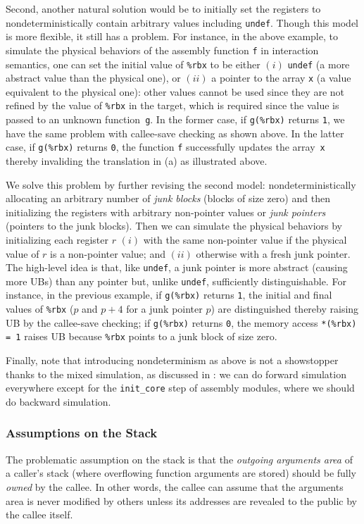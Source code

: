 Second, another natural solution would be to initially set the
\nip{} registers to nondeterministically contain arbitrary
values including \texttt{undef}. Though this model is more flexible,
it still has a problem. For instance, in the above example, to
simulate the physical behaviors of the assembly function \texttt{f} in
interaction semantics, one can set the initial value of \texttt{\%rbx} to
be either $(i)$ \texttt{undef} (\ie a more abstract value than the physical one), or
$(ii)$ a pointer to the array \texttt{x} (\ie a value equivalent to the physical one):
other values cannot be used since they are not refined by the value of \texttt{\%rbx} in the target,
which is required since the value is passed to an unknown function~\texttt{g}.
In the former case, if
\texttt{g(\%rbx)} returns \texttt{1}, we have the same problem with
callee-save checking as shown above.  In the latter case, if
\texttt{g(\%rbx)} returns \texttt{0}, the function \texttt{f}
successfully updates the array~\texttt{x} thereby invaliding the
translation in (a) as illustrated above.

We solve this problem by further revising the second model:
nondeterministically allocating an arbitrary number of \emph{junk
  blocks} (\ie blocks of size zero) and then initializing the
\nip{} registers with arbitrary non-pointer values or
\emph{junk pointers} (\ie pointers to the junk blocks).  Then we can
simulate the physical behaviors by initializing each register $r$
$(i)$ with the same non-pointer value if the physical value of $r$ is
a non-pointer value; and $(ii)$ otherwise with a fresh junk pointer.
The high-level idea is that, like \texttt{undef}, a junk pointer is
more abstract (\ie causing more UBs) than any pointer but, unlike
\texttt{undef}, sufficiently distinguishable. For instance,
in the previous example, if \texttt{g(\%rbx)} returns \texttt{1},
the initial and final values of \texttt{\%rbx} (\ie $p$ and $p+4$ for a junk pointer $p$)
are distinguished thereby raising UB by the callee-save checking;
if \texttt{g(\%rbx)} returns \texttt{0},
the memory access \texttt{*(\%rbx) = 1} raises UB because \texttt{\%rbx}
points to a junk block of size zero.

Finally, note that introducing nondeterminism as above is not a
showstopper thanks to the mixed simulation, as discussed in
: we can do forward
simulation everywhere except for the \texttt{init\_core} step of
assembly modules, where we should do backward simulation.

\subsubsection{Assumptions on the Stack}
\label{sec:overview-semantics-memory}
%
The problematic assumption on the stack is that the
\emph{outgoing arguments area} of a caller's stack (\ie where overflowing function
arguments are stored) should be fully \emph{owned} by the callee. In
other words, the callee can assume that the arguments area is never
modified by others unless its addresses are revealed to the public by
the callee itself.

